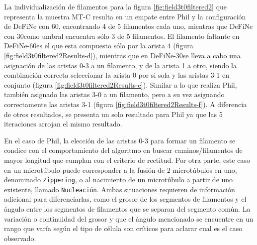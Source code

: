 
La individualizaci\'on de filamentos para la figura \ref{fig:field3t0filtered2} que representa la muestra MT-C resulta en un empate entre Phil y la configuraci\'on de DeFiNe con 60\textdegree, encontrando 4 de 5 filamentos cada uno, mientras que DeFiNe con 30\textdegree como umbral encuentra s\'olo 3 de 5 filamentos. El filamento faltante en DeFiNe-60\textdegree es el que esta compuesto s\'olo por la arista 4 (figura \ref{fig:field3t0filtered2Results-d}), mientras que en DeFiNe-30\textdegree se lleva a cabo una asignaci\'on de las aristas 0-3 a un filamento, y de la arista 1 a otro, siendo la combinaci\'on correcta seleccionar la arista 0 por si sola y las aristas 3-1 en conjunto (figura \ref{fig:field3t0filtered2Results-e}). Similar a lo que realiza Phil, tambi\'en asignado las aristas 3-0 a un filamento, pero a su vez asignando correctamente las aristas 3-1 (figura \ref{fig:field3t0filtered2Results-f}).  A diferencia de otros resultados, se presenta un solo resultado para Phil ya que las 5 iteraciones arrojan el mismo resultado.


En el caso de Phil, la elecci\'on de las aristas 0-3 para formar un filamento se condice con el comportamiento del algoritmo en buscar caminos/filamentos de mayor longitud que cumplan con el criterio de rectitud. Por otra parte, este caso en un microt\'ubulo puede corresponder a la fusi\'on de 2 microt\'ubulos en uno, denominado {\tt Zippering}, o al nacimiento de un microt\'ubulo a partir de uno existente, llamado {\tt Nucleaci\'on}. Ambas situaciones requieren de informaci\'on adicional para diferenciarlas, como el grosor de los segmentos de filamentos y el \'angulo entre los segmentos de filamentos que se separan del segmento com\'un. La variaci\'on o continuidad del grosor y que el \'angulo mencionado se encuentre en un rango que var\'ia seg\'un el tipo de c\'elula son cr\'iticos para aclarar cual es el caso observado. 


